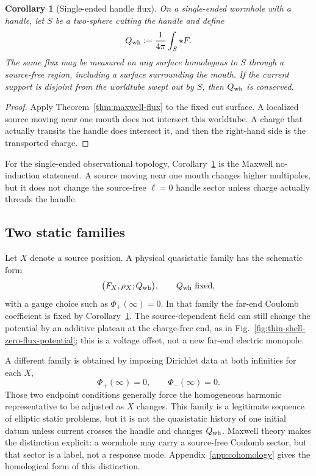\documentclass[aps,prd,10pt,onecolumn,nofootinbib,superscriptaddress,floatfix]{revtex4-2}
\newtheorem{corollary}{Corollary}
\begin{document}
\begin{corollary}[Single-ended handle flux]
\label{cor:maxwell-handle}
On a single-ended wormhole with a handle, let $S$ be a two-sphere cutting the
handle and define
\begin{equation}
  Q_{\rm wh}:=\frac{1}{4\pi}\int_S\star F .
\end{equation}
The same flux may be measured on any surface homologous to $S$ through a
source-free region, including a surface surrounding the mouth.
If the current support is disjoint from the worldtube swept out by $S$, then
$Q_{\rm wh}$ is conserved.
\end{corollary}

\begin{proof}
Apply Theorem~\ref{thm:maxwell-flux} to the fixed cut surface.  A
localized source moving near one mouth does not intersect this worldtube.  A
charge that actually transits the handle does intersect it, and then the
right-hand side is the transported charge.
\end{proof}

For the single-ended observational topology, Corollary~\ref{cor:maxwell-handle}
is the Maxwell no-induction statement.  A source moving near one mouth changes
higher multipoles, but it does not change the source-free $\ell=0$ handle
sector unless charge actually threads the handle.

\subsection{Two static families}
\label{sec:maxwell-two-families}

Let $X$ denote a source position.  A physical quasistatic family has the
schematic form
\begin{equation}
  \big(F_X,\rho_X;Q_{\rm wh}\big),
  \qquad Q_{\rm wh}\ \hbox{fixed},
\end{equation}
with a gauge choice such as $\Phi_+(\infty)=0$.  In that family the far-end
Coulomb coefficient is fixed by Corollary~\ref{cor:maxwell-handle}.  The
source-dependent field can still change the potential by an additive plateau at
the charge-free end, as in Fig.~\ref{fig:thin-shell-zero-flux-potential}; this
is a voltage offset, not a new far-end electric monopole.

A different family is obtained by imposing Dirichlet data at both infinities for
each $X$,
\begin{equation}
  \Phi_+(\infty)=0,\qquad \Phi_-(\infty)=0 .
\end{equation}
Those two endpoint conditions generally force the homogeneous harmonic
representative to be adjusted as $X$ changes.  This family is a legitimate
sequence of elliptic static problems, but it is not the quasistatic
history of one initial datum unless current crosses the handle and changes
$Q_{\rm wh}$.  Maxwell theory makes the distinction explicit: a wormhole may
carry a source-free Coulomb sector, but that sector is a label, not a response
mode.  Appendix~\ref{app:cohomology} gives the homological form of this
distinction.
\end{document}
